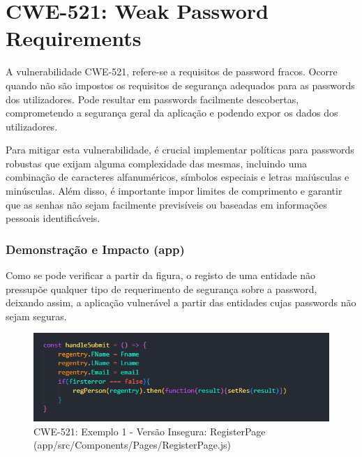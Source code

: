 \section{CWE-521: Weak Password Requirements}
\label{sec.cwe521}

A vulnerabilidade CWE-521, refere-se a requisitos de password fracos. Ocorre quando não são impostos os requisitos de segurança adequados para as passwords dos utilizadores. Pode resultar em passwords facilmente descobertas, comprometendo a segurança geral da aplicação e podendo expor os dados dos utilizadores. 

Para mitigar esta vulnerabilidade, é crucial implementar políticas para passwords robustas que exijam alguma complexidade das mesmas, incluindo uma combinação de caracteres alfanuméricos, símbolos especiais e letras maiúsculas e minúsculas. Além disso, é importante impor limites de comprimento e garantir que as senhas não sejam facilmente previsíveis ou baseadas em informações pessoais identificáveis.

\subsubsection{Demonstração e Impacto (app)}
Como se pode verificar a partir da figura, o registo de uma entidade não pressupõe qualquer tipo de requerimento de segurança sobre a password, deixando assim, a aplicação vulnerável a partir das entidades cujas passwords não sejam seguras.
\begin{figure}[H]
  \centering
  \includegraphics[width=16cm]{images/CWE521-unsafe.png}
  \caption{CWE-521: Exemplo 1 - Versão Insegura: RegisterPage (app/src/Components/Pages/RegisterPage.js)}
  \label{fig:cwe521-unsafe}
\end{figure}
